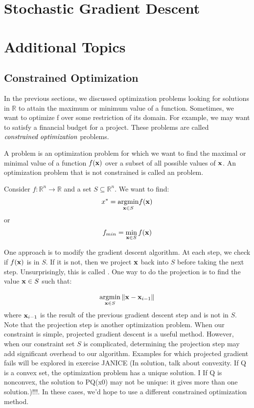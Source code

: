 \section{Stochastic Gradient Descent}

\section{Additional Topics}

\subsection{Constrained Optimization}

In the previous sections, we discussed optimization problems looking for solutions in $\mathbb{R}$ to attain the maximum or minimum value of a function. Sometimes, we want to optimize f over some restriction of its domain. For example, we may want to satisfy a financial budget for a project. These problems are called $\define{constrained optimization}$ problems.

\begin{definition}\label{def_constrained_optimization} 
A  problem is an optimization problem for which we want to find the maximal or minimal value of a function $f(\vx)$ over a subset of all possible values of $\vx$. An optimization problem that is not constrained is called an  problem.
\end{definition}

Consider $f:\mathbb{R}^n\rightarrow\mathbb{R}$ and a set $S \subseteq \mathbb{R}^n$. We want to find:
$$x^*=\underset{\vx \in S}{\argmin} f(\vx)$$
or 
$$f_{min} = \min_{\vx \in S} f(\vx)$$

One approach is to modify the gradient descent algorithm. At each step, we check if $f(\vx)$ is in $S$. If it is not, then we project $\vx$ back into $S$ before taking the next step. Unsurprisingly, this is called . One way to do the projection is to find the value $\vx\in S$ such that:

$$ \underset{\vx \in S}{\argmin} \norm{\vx - \vx_{i-1}}$$
where $\vx_{i-1}$ is the result of the previous gradient descent step and is not in $S$. \\

Note that the projection step is another optimization problem. When our constraint is simple, projected gradient descent is a useful method. However, when our constraint set $S$ is complicated, determining the projection step may add significant overhead to our algorithm. Examples for which projected gradient fails will be explored in exercise JANICE (In solution, talk about convexity. If Q is a convex set, the optimization problem has a unique solution.
I If Q is nonconvex, the solution to PQ(x0) may not be unique: it gives
more than one solution.)!!!. In these cases, we'd hope to use a different constrained optimization method. 

